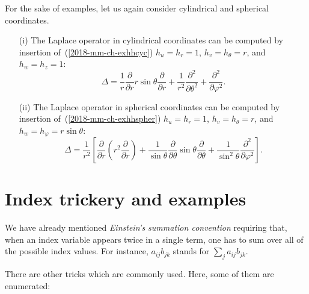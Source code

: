 {
\color{blue}
\bexample
For the sake of examples, let us again consider cylindrical and spherical coordinates.

\begin{itemize}
\item[(i)]
The Laplace operator in cylindrical coordinates
can be computed by insertion of~(\ref{2018-mm-ch-exhhcyc})
$h_u=h_r= 1$, $h_v=h_\theta= r$, and $h_w=h_z= 1$:
\begin{equation}
\Delta
=
\frac{ 1 }{r}
\frac{\partial   }{\partial r} r  \sin \theta\frac{\partial   }{\partial r}  +
\frac{ 1 }{r^2} \frac{\partial^2   }{\partial \theta^2}  +
\frac{\partial^2   }{\partial \varphi^2}
.
\label{2018-mm-ch-laplaceocylin}
\end{equation}


\item[(ii)]
The Laplace operator in spherical coordinates
can be computed by insertion of~(\ref{2018-mm-ch-exhhspher})
$h_u=h_r= 1$, $h_v=h_\theta= r$, and $h_w=h_\varphi= r \sin \theta$:
\begin{equation}
\Delta
=
\frac{1}{r^2} \left[ \frac{\partial}{\partial r}\left( r^2\frac{\partial}{\partial r}\right)
+
\frac{1}{\sin \theta}   \frac{\partial}{\partial \theta }
\sin \theta \frac{\partial}{\partial \theta }
+
\frac{1}{\sin^2 \theta} \frac{\partial^2}{\partial \varphi^2 }
\right]
.
\label{2018-mm-ch-laplaceocsc}
\end{equation}
\end{itemize}

\eexample
}


\section{Index trickery and examples}

We have already mentioned {\em Einstein's summation convention}
requiring that, when an index variable appears twice in a single term, one has to
sum over all of the possible index values. For instance, $a_{ij}b_{jk}$ stands for $\sum_j a_{ij}b_{jk}$.

There are other tricks which are commonly used.
Here, some of them are enumerated:

